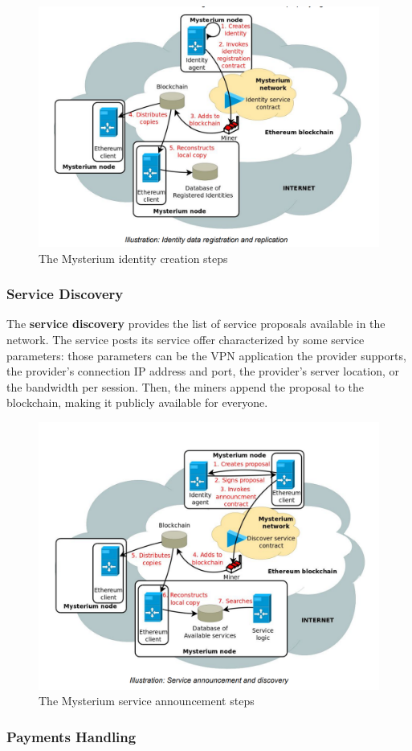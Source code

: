 \documentclass[12pt]{article}
\begin{document}
	\begin{figure}
		\includegraphics[width=0.5\linewidth]{images/mysterium_identity_creation.png}
		\caption{The Mysterium identity creation steps}
	\end{figure}

	\subsubsection{Service Discovery}

	The \textbf{service discovery} provides the list of service proposals available in the network. The service posts its service offer characterized by some service parameters: those parameters can be the VPN application the provider supports, the provider's connection IP address and port, the provider's server location, or the bandwidth per session. Then, the miners append the proposal to the blockchain, making it publicly available for everyone.\\

	\begin{figure}
		\includegraphics[width=0.5\linewidth]{images/mysterium_service_announcement.png}
		\caption{The Mysterium service announcement steps}
	\end{figure}
	
	\subsubsection{Payments Handling}
\end{document}
